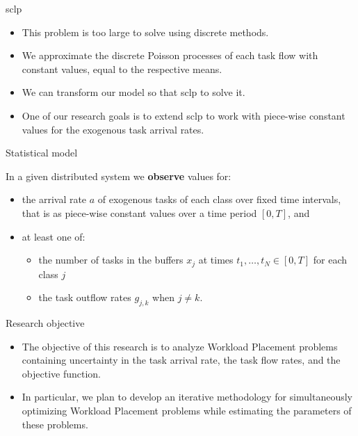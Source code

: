 \documentclass[pdf]{beamer}
\theoremstyle{definition}
\begin{document}
\begin{frame}{\acrshort{sclp}}
        \begin{itemize}
            \item This problem is too large to solve using discrete methods.
            \item We approximate the discrete Poisson processes of each task flow with constant values,
            equal to the respective means.
            \item We can transform our model so that \Gls{sclp} to solve it.
            \item One of our research goals is to extend \gls{sclp} to work with piece-wise constant values for the exogenous task arrival rates.
        \end{itemize}
\end{frame}


\begin{frame}{Statistical model}

    In a given distributed system we \textbf{observe} values for:

    \begin{itemize}

        \item the arrival rate $a$ of exogenous tasks of each class over fixed time intervals,
        that is as piece-wise constant values over a time period $[0,T]$,
        and

        \item at least one of:

        \begin{itemize}
            \item the number of tasks in the buffers $x_j$ at times
            $t_1, \ldots, t_N \in [0,T]$ for each class $j$
            \item the task outflow rates $g_{j,k}$ when $j \neq k$.
        \end{itemize}

    \end{itemize}
\end{frame}


\begin{frame}{Research objective}
    \begin{itemize}
        \item The objective of this research is to analyze Workload Placement problems
        containing uncertainty in the task arrival rate,
        the task flow rates,
        and the objective function.
        \item In particular,
        we plan to develop an iterative methodology for simultaneously  optimizing Workload Placement problems while estimating the parameters of these problems.
    \end{itemize}
\end{frame}
\end{document}

